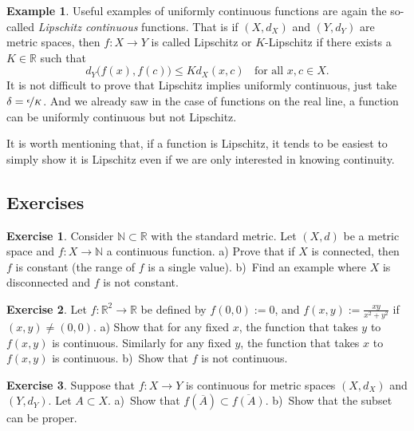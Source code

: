 \documentclass[12pt]{book}
\newcommand{\R}{{\mathbb{R}}}
\newcommand{\N}{{\mathbb{N}}}
\newcommand{\myindex}[1]{#1\index{#1}}
\theoremstyle{plain}
\theoremstyle{remark}
\theoremstyle{definition}
\theoremstyle{exercise}
\newtheorem{exercise}{Exercise}[section]
\theoremstyle{example}
\newtheorem{example}[thm]{Example}
\begin{document}
\begin{example}
Useful examples of uniformly continuous functions are again the so-called
\emph{\myindex{Lipschitz continuous}} functions.  That is if
$(X,d_X)$ and $(Y,d_Y)$ are metric spaces, then $f \colon X \to Y$
is called Lipschitz or $K$-Lipschitz if there exists a $K \in \R$ such that
\begin{equation*}
d_Y\bigl(f(x),f(c)\bigr) \leq K d_X(x,c)
\ \ \ \ \text{for all } x,c \in X.
\end{equation*}
It is not difficult to prove that Lipschitz implies uniformly continuous,
just take $\delta = \nicefrac{\epsilon}{K}$.  And we already saw in the case
of functions on the real line, a function can be uniformly continuous
but not Lipschitz.

It is worth mentioning that,
if a function is Lipschitz, it tends to be
easiest to simply show it is Lipschitz even if we are only
interested in knowing continuity.
\end{example}

\subsection{Exercises}

\begin{exercise}
Consider $\N \subset \R$ with the standard metric.  Let $(X,d)$ be a
metric space and $f \colon X \to \N$ a continuous function.  a) Prove that
if $X$ is connected, then $f$ is constant (the range of $f$ is a single
value).  b)~Find an example where $X$ is disconnected and $f$ is not constant.
\end{exercise}

\begin{exercise} \label{exercise:dicontR2}
Let $f \colon \R^2 \to \R$ be defined by $f(0,0) := 0$, and
$f(x,y) := \frac{xy}{x^2+y^2}$ if $(x,y) \not= (0,0)$.  a) Show that for any fixed $x$,
the function that takes $y$ to $f(x,y)$ is continuous.  Similarly
for any fixed $y$, the function that takes $x$ to $f(x,y)$ is continuous.
b)~Show that $f$ is not continuous.
\end{exercise}

\begin{exercise} 
Suppose that $f \colon X \to Y$ is continuous for metric spaces $(X,d_X)$
and $(Y,d_Y)$.  Let $A \subset X$.  a)~Show that $f(\overline{A}) \subset
\overline{f(A)}$.  b)~Show that the subset can be proper.
\end{exercise}
\end{document}
